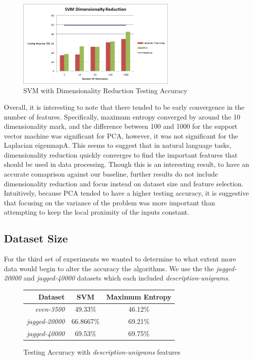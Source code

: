 \begin{figure}[!h]
\begin{center}
\caption{SVM with Dimensionality Reduction Testing Accuracy}
\includegraphics[width=0.7\textwidth]{SVM_Dimensionality_Reduction.png}
\end{center}
\end{figure}

Overall, it is interesting to note that there tended to be early convergence in the number of features.  Specifically, maximum entropy converged by around the 10 dimensionality mark, and the difference between 100 and 1000 for the support vector machine was significant for PCA, however, it was not significant for the Laplacian eigenmapA.  This seems to suggest that in natural language tasks, dimensionality reduction quickly converges to find the important features that should be used in data processing.  Though this is an interesting result, to have an accurate comaprison against our baseline, further results do not include dimensionality reduction and focus instead on dataset size and feature selection.  Intuitively, because PCA tended to have a higher testing accuracy, it is suggestive that focusing on the variance of the problem was more important than attempting to keep the local proximity of the inputs constant.

\subsection{Dataset Size}
For the third set of experiments we wanted to determine to what extent more data would begin to alter the accuracy the algorithms.  We use the the \emph{jagged-20000} and \emph{jagged-40000} datasets which each included \emph{description-unigrams}.

\begin{figure}[!h]
\begin{center}
\caption{Testing Accuracy with \emph{description-unigrams} features}
\begin{tabular}{| r | c | c |}
\hline
\textbf{Dataset} & \textbf{SVM} & \textbf{Maximum Entropy} \\ \hline
\emph{even-3500} & 49.33\% & 46.12\% \\ \hline
\emph{jagged-20000} & 66.8667\% & 69.21\% \\ \hline
\emph{jagged-40000} & 69.53\% & 69.75\% \\ \hline
\end{tabular}
\end{center}
\end{figure}

